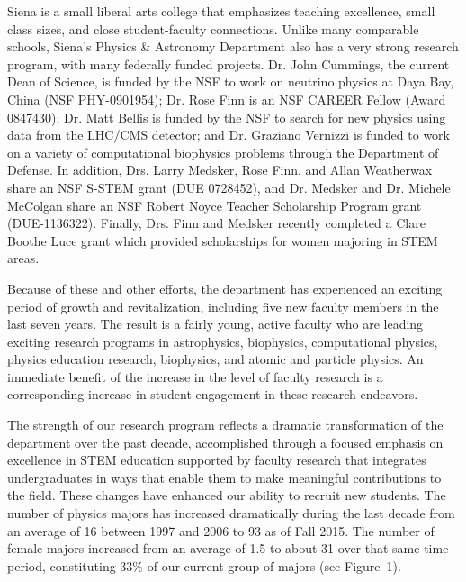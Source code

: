 \documentclass[12pt, preprint]{aastex}
\begin{document}
Siena is a small liberal arts college that emphasizes teaching excellence, small
class sizes, and close student-faculty connections. Unlike many comparable
schools, Siena's Physics \& Astronomy Department also has a very strong research
program, with many federally funded projects. Dr. John Cummings, the current
Dean of Science, is funded by the NSF to work on neutrino physics at Daya Bay,
China (NSF PHY-0901954); Dr. Rose Finn is an NSF CAREER Fellow (Award 0847430);
Dr. Matt Bellis is funded by the NSF to search for new physics using data from
the LHC/CMS detector; and Dr. Graziano Vernizzi is funded to work on a variety
of computational biophysics problems through the Department of Defense.  In
addition, Drs. Larry Medsker, Rose Finn, and Allan Weatherwax share an NSF
S-STEM grant (DUE 0728452), and Dr. Medsker and Dr. Michele McColgan share an
NSF Robert Noyce Teacher Scholarship Program grant (DUE-1136322).  Finally,
Drs. Finn and Medsker recently completed a Clare Boothe Luce grant which
provided scholarships for women majoring in STEM areas.

Because of these and other efforts, the department has experienced an exciting
period of growth and revitalization, including five new faculty members in the
last seven years.  The result is a fairly young, active faculty who are leading
exciting research programs in astrophysics, biophysics, computational physics,
physics education research, biophysics, and atomic and particle physics. An
immediate benefit of the increase in the level of faculty research is a
corresponding increase in student engagement in these research endeavors.

The strength of our research program reflects a dramatic transformation of the
department over the past decade, accomplished through a focused emphasis on
excellence in STEM education supported by faculty research that integrates
undergraduates in ways that enable them to make meaningful contributions to the
field. These changes have enhanced our ability to recruit new students.  The
number of physics majors has increased dramatically during the last decade from
an average of 16 between 1997 and 2006 to 93 as of Fall 2015. The number of
female majors increased from an average of 1.5 to about 31 over that same time
period, constituting 33\% of our current group of majors (see Figure~1).

\end{document}
